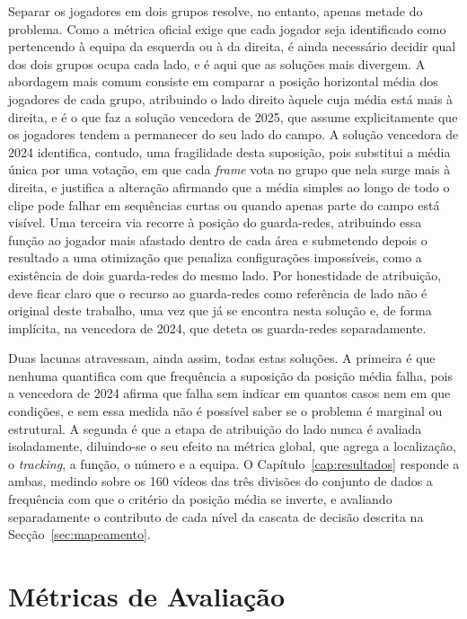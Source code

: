 Separar os jogadores em dois grupos resolve, no entanto, apenas metade do problema. Como a
métrica oficial exige que cada jogador seja identificado como pertencendo à equipa da
esquerda ou à da direita, é ainda necessário decidir qual dos dois grupos ocupa cada lado, e
é aqui que as soluções mais divergem. A abordagem mais comum consiste em comparar a posição
horizontal média dos jogadores de cada grupo, atribuindo o lado direito àquele cuja média
está mais à direita, e é o que faz a solução vencedora de 2025, que assume explicitamente
que os jogadores tendem a permanecer do seu lado do campo. A solução vencedora de 2024
identifica, contudo, uma fragilidade desta suposição, pois substitui a média única por uma
votação, em que cada \emph{frame} vota no grupo que nela surge mais à direita, e justifica a
alteração afirmando que a média simples ao longo de todo o clipe pode falhar em sequências
curtas ou quando apenas parte do campo está visível. Uma terceira via recorre à posição do
guarda-redes, atribuindo essa função ao jogador mais afastado dentro de cada área e
submetendo depois o resultado a uma otimização que penaliza configurações impossíveis, como
a existência de dois guarda-redes do mesmo lado. Por honestidade de atribuição, deve
ficar claro que o recurso ao guarda-redes como referência de lado não é original deste
trabalho, uma vez que já se encontra nesta solução e, de forma implícita, na vencedora de
2024, que deteta os guarda-redes separadamente.

Duas lacunas atravessam, ainda assim, todas estas soluções. A primeira é que nenhuma
quantifica com que frequência a suposição da posição média falha, pois a vencedora de 2024
afirma que falha sem indicar em quantos casos nem em que condições, e sem essa medida não é
possível saber se o problema é marginal ou estrutural. A segunda é que a etapa de atribuição
do lado nunca é avaliada isoladamente, diluindo-se o seu efeito na métrica global, que agrega
a localização, o \emph{tracking}, a função, o número e a equipa. O Capítulo~\ref{cap:resultados}
responde a ambas, medindo sobre os 160 vídeos das três divisões do conjunto de dados a
frequência com que o critério da posição média se inverte, e avaliando separadamente o
contributo de cada nível da cascata de decisão descrita na Secção~\ref{sec:mapeamento}.

\section{Métricas de Avaliação}\label{sec:metricas}

